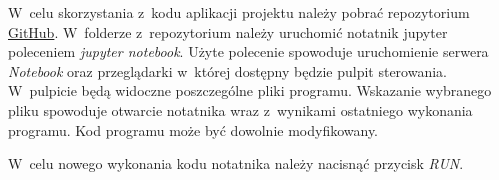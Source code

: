 \documentclass[11pt]{report}
\begin{document}
    W~celu skorzystania z~kodu aplikacji projektu należy pobrać repozytorium \href{https://github.com/mijapa/GDELT}{GitHub}.
    W~folderze z~repozytorium należy uruchomić notatnik jupyter poleceniem \textit{jupyter notebook}.
    Użyte polecenie spowoduje uruchomienie serwera \textit{Notebook} oraz przeglądarki w~której dostępny będzie pulpit sterowania.
    W~pulpicie będą widoczne poszczególne pliki programu.
    Wskazanie wybranego pliku spowoduje otwarcie notatnika wraz z~wynikami ostatniego wykonania programu.
    Kod programu może być dowolnie modyfikowany.

    W~celu nowego wykonania kodu notatnika należy nacisnąć przycisk \textit{RUN}.



    \newpage
    \printbibliography[title={Bibliografia}]
\end{document}

